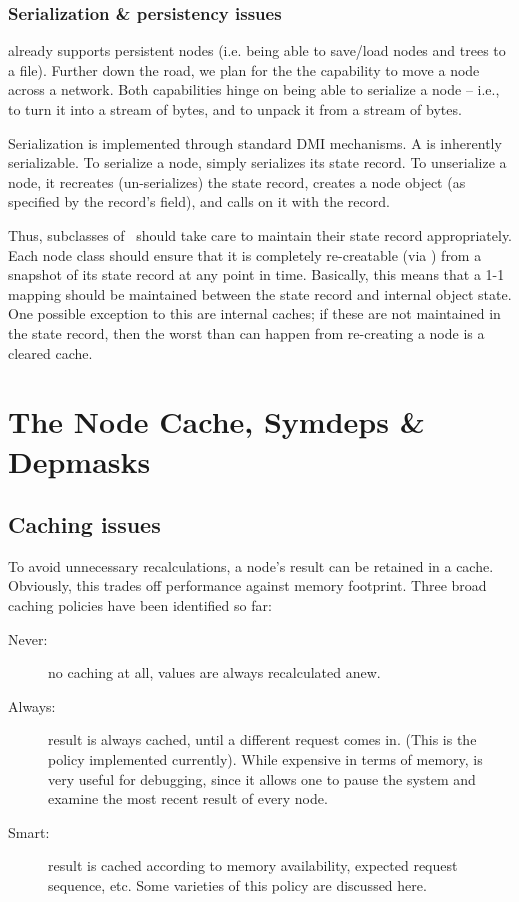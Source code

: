 \subsection{Serialization \& persistency issues}

   already supports persistent nodes (i.e. being able to
  save/load nodes and trees to a file). Further down the road, we plan for the
  the capability to move a node across a network. Both capabilities hinge on
  being able to serialize a node -- i.e., to turn it into a stream of bytes,
  and to unpack it from a stream of bytes.

  Serialization is implemented through standard DMI mechanisms. A
   is inherently serializable. To serialize a node,
   simply serializes its state record. To unserialize a node, it
  recreates (un-serializes) the state record, creates a node object (as
  specified by the record's  field), and calls  on it with
  the record. 

  Thus, subclasses of \Node\ should take care to maintain their state record
  appropriately. Each node class should ensure that it is completely
  re-creatable (via ) from a snapshot of its state record at any
  point in time. Basically, this means that a 1-1 mapping should be maintained
  between the state record and internal object state. One possible exception to
  this are internal caches; if these are not maintained in the state record,
  then the worst than can happen from re-creating a node is a cleared cache.
  
\chapter{The Node Cache, Symdeps \& Depmasks}

\section{Caching issues}

  To avoid unnecessary recalculations, a node's result can be retained in a
  cache. Obviously, this trades off performance against memory footprint. Three
  broad caching policies have been identified so far:

  \begin{description}
  
  \item[Never:] no caching at all, values are always recalculated anew. 
   
  \item[Always:] result is always cached, until a different request comes in.
    (This is the policy implemented currently). While expensive in terms of
    memory, is very useful for debugging, since it allows one to pause the
    system and examine the most recent result of every node.

  \item[Smart:] result is cached according to memory availability, expected
    request sequence, etc. Some varieties of this policy are discussed here.

  \end{description}
  
